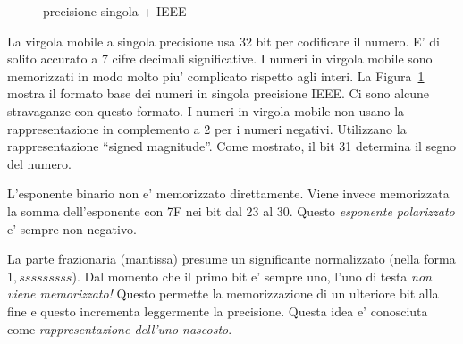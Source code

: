 \begin{figure}[t]
\caption{precisione singola + IEEE\label{fig:IEEEsingle}}
\end{figure}

La virgola mobile a singola precisione usa 32 bit per codificare il numero.
E' di solito accurato a 7 cifre decimali significative. I numeri in
virgola mobile sono memorizzati in modo molto piu' complicato rispetto
agli interi. La Figura~\ref{fig:IEEEsingle} mostra il formato base dei 
numeri in singola precisione IEEE. Ci sono alcune stravaganze con questo 
formato. I numeri in virgola mobile non usano la rappresentazione in 
complemento a 2 per i numeri negativi. Utilizzano la rappresentazione
``signed magnitude''. Come mostrato, il bit 31 determina il segno del
numero. 

L'esponente binario non e' memorizzato direttamente. Viene invece
memorizzata la somma dell'esponente con 7F nei bit dal 23 al 30. Questo
\emph{esponente polarizzato} e' sempre non-negativo.

La parte frazionaria (mantissa) presume un significante normalizzato
(nella forma $1,sssssssss$). Dal momento che il primo bit e' sempre 
uno, l'uno di testa \emph{non viene memorizzato!} Questo permette
la memorizzazione di un ulteriore bit alla fine e questo incrementa
leggermente la precisione. Questa idea e' conosciuta come 
\emph{rappresentazione dell'uno nascosto}.

